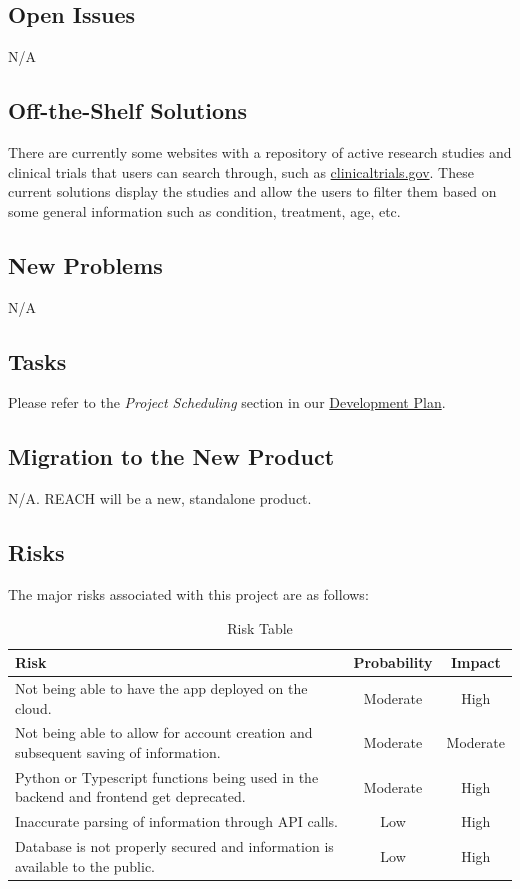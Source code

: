 \documentclass[12pt, titlepage]{article}
\begin{document}
\subsection{Open Issues}

N/A

\subsection{Off-the-Shelf Solutions}

There are currently some websites with a repository of active research studies and clinical trials that users can search through, such as 
\href{https://clinicaltrials.gov/}{clinicaltrials.gov}. These current solutions display the studies and allow the users to filter them based 
on some general information such as condition, treatment, age, etc.

\subsection{New Problems}

N/A

\subsection{Tasks}

Please refer to the \textit{Project Scheduling} section in our
\href{https://github.com/davimang/REACH/blob/main/docs/DevelopmentPlan/DevelopmentPlan.pdf}{Development Plan}.


\subsection{Migration to the New Product}

N/A. REACH will be a new, standalone product.

\subsection{Risks}
The major risks associated with this project are as follows:
\begin{table}[htbp]
    \caption{Risk Table}
    \begin{tabular}{|p{10cm}|c|c|}
        \hline
        \textbf{Risk} & \textbf{Probability} & \textbf{Impact} \\
        \hline
        Not being able to have the app deployed on the cloud. &  Moderate & High \\
        \hline
        Not being able to allow for account creation and subsequent saving of information.
        & Moderate & Moderate \\
        \hline
        Python or Typescript functions being used in the backend and frontend get deprecated. & Moderate & High \\
        \hline
        Inaccurate parsing of information through API calls.
        & Low & High \\
        \hline
        Database is not properly secured and information is available to the public. & Low & High \\
        \hline
    \end{tabular}
\end{table}
\end{document}
